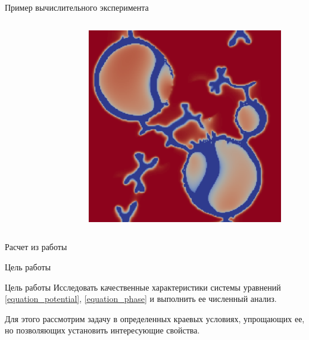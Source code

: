 \begin{frame}{Пример вычислительного эксперимента}
\begin{columns}
\begin{figure}
	\end{figure}
	\begin{figure}
		\includegraphics[width=\textwidth]{figures/model_example_3.png}
	\end{figure}
\end{columns}
\begin{center}
	Расчет из работы \cite{zipunova_experiment}
\end{center}
\end{frame}


\begin{frame}{Цель работы}
\begin{block}{Цель работы}
	Исследовать качественные характеристики системы уравнений \eqref{equation_potential},
	\eqref{equation_phase} и выполнить ее численный анализ.
\end{block}
Для этого рассмотрим задачу в определенных краевых условиях, упрощающих ее, но позволяющих
установить интересующие свойства.
\end{frame}